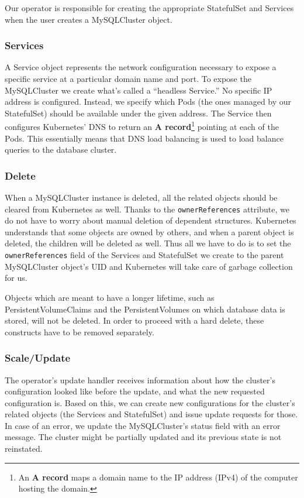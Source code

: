 Our operator is responsible for creating the appropriate StatefulSet and Services when the user
creates a MySQLCluster object.

\subsubsection*{Services}
A Service object represents the network configuration necessary to expose a specific service at a
particular domain name and port. To expose the MySQLCluster we create what’s called a
“headless Service.” No specific IP address is configured. Instead, we specify which Pods (the ones
managed by our StatefulSet) should be available under the given address. The Service then configures
Kubernetes’ DNS to return an \textbf{A record}\footnote{An \textbf{A record} maps a domain name to
the IP address (IPv4) of the computer hosting the domain.} pointing at each of the Pods. This
essentially means that DNS load balancing is used to load balance queries to the database cluster.

\subsubsection*{Delete}
When a MySQLCluster instance is deleted, all the related objects should be cleared from Kubernetes
as well. Thanks to the \texttt{ownerReferences} attribute, we do not have to worry about manual
deletion of dependent structures. Kubernetes understands that some objects are owned by others, and
when a parent object is deleted, the children will be deleted as well. Thus all we have to do is to set
the \texttt{ownerReferences} field of the Services and StatefulSet we create to the parent
MySQLCluster object’s UID and Kubernetes will take care of garbage collection for us.

Objects which are meant to have a longer lifetime, such as PersistentVolumeClaims and the
PersistentVolumes on which database data is stored, will not be deleted. In order to
proceed with a hard delete, these constructs have to be removed separately.

\subsubsection*{Scale/Update}
The operator’s update handler receives information about how the cluster’s configuration looked
like before the update, and what the new requested configuration is. Based on this, we can create
new configurations for the cluster’s related objects (the Services and StatefulSet) and issue update
requests for those. In case of an error, we update the MySQLCluster’s status field with an error
message. The cluster might be partially updated and its previous state is not reinstated.

